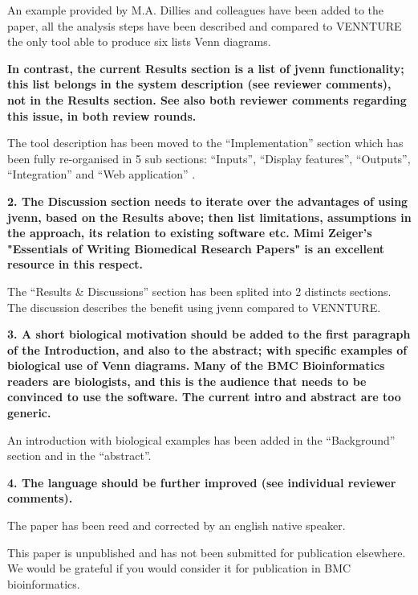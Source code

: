 \documentclass[10pt,stdletter,dateno,sigleft]{newlfm} %
\begin{document}
\begin{newlfm}
An example provided by M.A. Dillies and colleagues have been added to the paper,
all the analysis steps have been described and compared to VENNTURE the only
tool able to produce six lists Venn diagrams.

\textbf{In contrast, the current Results section is a list of jvenn
functionality; this list belongs in the system description (see reviewer
comments), not in the Results section. See also both reviewer comments regarding
this issue, in both review rounds.}

The tool description has been moved to the ``Implementation'' section which has
been fully re-organised in 5 sub sections: ``Inputs'', ``Display features'',
``Outputs'', ``Integration'' and ``Web application'' .


\textbf{2. The Discussion section needs to iterate over the advantages of using
jvenn, based on the Results above; then list limitations, assumptions in the
approach, its relation to existing software etc. Mimi Zeiger's "Essentials of
Writing Biomedical Research Papers" is an excellent resource in this respect.}

The ``Results & Discussions'' section has been splited into 2 distincts
sections. The discussion describes the benefit using jvenn compared to VENNTURE.


\textbf{3. A short biological motivation should be added to the first paragraph
of the Introduction, and also to the abstract; with specific examples of
biological use of Venn diagrams. Many of the BMC Bioinformatics readers are
biologists, and this is the audience that needs to be convinced to use the
software. The current intro and abstract are too generic.}

An introduction with biological examples has been added in the ``Background''
section and in the ``abstract''.


\textbf{4. The language should be further improved (see individual reviewer
comments).}

The paper has been reed and corrected by an english native speaker.



This paper is unpublished and has not been submitted for publication elsewhere. 
We would be grateful if you would consider it for publication in BMC 
bioinformatics.


\end{newlfm}
\end{document}
